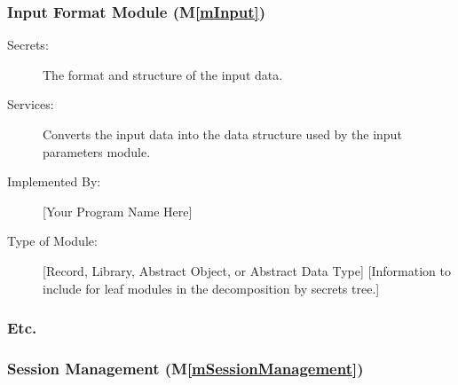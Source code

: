 \documentclass[12pt, titlepage]{article}
\newcommand{\mref}[1]{M\ref{#1}}
\begin{document}
\subsubsection{Input Format Module (\mref{mInput})}

\begin{description}
\item[Secrets:]The format and structure of the input data.
\item[Services:]Converts the input data into the data structure used by the
  input parameters module.
\item[Implemented By:] [Your Program Name Here]
\item[Type of Module:] [Record, Library, Abstract Object, or Abstract Data Type]
  [Information to include for leaf modules in the decomposition by secrets tree.]
\end{description}

\subsubsection{Etc.}

\subsubsection{Session Management (\mref{mSessionManagement})}
\end{document}
